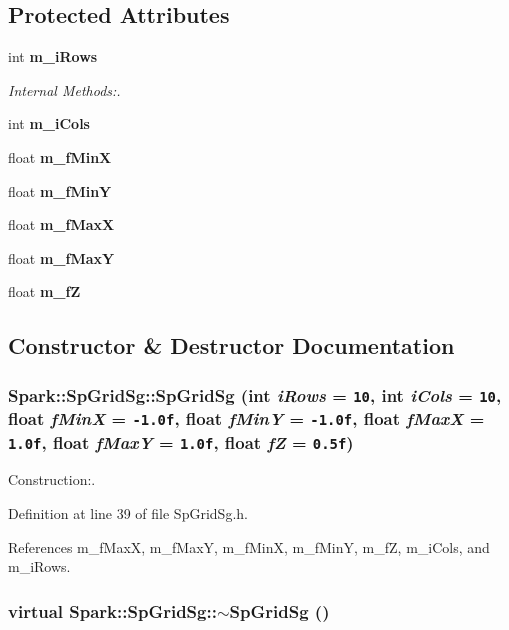 \subsection*{Protected Attributes}
\begin{CompactItemize}
\item 
int {\bf m\_\-i\-Rows}
\begin{CompactList}\small\item\em Internal Methods:. \item\end{CompactList}\item 
int {\bf m\_\-i\-Cols}
\item 
float {\bf m\_\-f\-Min\-X}
\item 
float {\bf m\_\-f\-Min\-Y}
\item 
float {\bf m\_\-f\-Max\-X}
\item 
float {\bf m\_\-f\-Max\-Y}
\item 
float {\bf m\_\-f\-Z}
\end{CompactItemize}


\subsection{Constructor \& Destructor Documentation}
\subsubsection{\setlength{\rightskip}{0pt plus 5cm}Spark::Sp\-Grid\-Sg::Sp\-Grid\-Sg (int {\em i\-Rows} = {\tt 10}, int {\em i\-Cols} = {\tt 10}, float {\em f\-Min\-X} = {\tt -1.0f}, float {\em f\-Min\-Y} = {\tt -1.0f}, float {\em f\-Max\-X} = {\tt 1.0f}, float {\em f\-Max\-Y} = {\tt 1.0f}, float {\em f\-Z} = {\tt 0.5f})\hspace{0.3cm}{\tt  [inline]}}\label{classSpark_1_1SpGridSg_a0}


Construction:. 

Definition at line 39 of file Sp\-Grid\-Sg.h.

References m\_\-f\-Max\-X, m\_\-f\-Max\-Y, m\_\-f\-Min\-X, m\_\-f\-Min\-Y, m\_\-f\-Z, m\_\-i\-Cols, and m\_\-i\-Rows.
\subsubsection{\setlength{\rightskip}{0pt plus 5cm}virtual Spark::Sp\-Grid\-Sg::$\sim${\bf Sp\-Grid\-Sg} ()\hspace{0.3cm}{\tt  [inline, virtual]}}\label{classSpark_1_1SpGridSg_a1}



